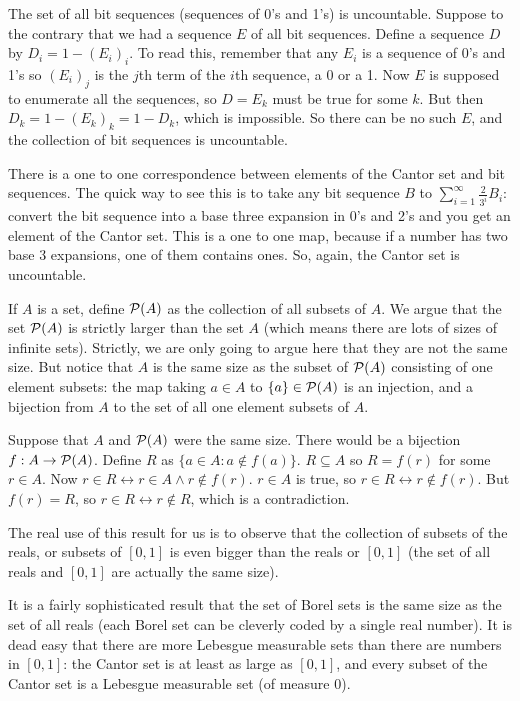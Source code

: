 \documentclass[12pt]{article}
\begin{document}
The set of all bit sequences (sequences of 0's and 1's) is uncountable.  Suppose to the contrary that we had a sequence $E$ of all bit sequences.  Define a sequence $D$ by
$D_i = 1 - (E_i)_i$.  To read this, remember that any $E_i$ is a sequence of 0's and 1's so $(E_i)_j$ is the $j$th term of the $i$th sequence, a 0 or a  1.  Now $E$ is supposed
to enumerate all the sequences, so $D = E_k$ must be true for some $k$.  But then $D_k = 1 - (E_k)_k=1-D_k$, which is impossible.  So there can be no such $E$, and the collection of bit sequences is uncountable.

There is a one to one correspondence between elements of the Cantor set and bit sequences.  The quick way to see this is to take any bit sequence $B$ to $\sum_{i=1}^\infty \frac2{3^i}B_i$:  convert the bit sequence into a base three expansion in 0's and 2's and you get an element of the Cantor set.  This is a one to one map, because if a number has two base 3 expansions, one of them contains ones.  So, again, the Cantor set is uncountable.

If $A$ is a set, define ${\cal P}(A)$ as the collection of all subsets of $A$.  We argue that the set ${\cal P}(A)$ is strictly larger than the set $A$ (which means there are lots of sizes of infinite sets).
Strictly, we are only going to argue here that they are not the same size.  But notice that $A$ is the same size as the subset of  ${\cal P}(A)$ consisting of one element subsets:  the map taking $a \in A$ to
$\{a\} \in {\cal P}(A)$ is an injection, and a bijection from $A$ to the set of all one element subsets of $A$.

Suppose that $A$ and ${\cal P}(A)$ were the same size.  There would be a bijection $f:A \rightarrow {\cal P}(A)$.  Define $R$ as $\{a \in A:a \not\in f(a)\}$.  $R \subseteq A$ so $R=f(r)$ for some $r \in A$.  Now $r \in R \leftrightarrow r\in A \wedge r \not\in f(r)$.  $r \in A$ is true, so $r \in R \leftrightarrow r \not\in f(r)$.  But $f(r) = R$, so $r \in R \leftrightarrow r \not\in R$, which is a contradiction.

The real use of this result for us is to observe that the collection of subsets of the reals, or subsets of $[0,1]$ is even bigger than the reals or $[0,1]$ (the set of all reals and $[0,1]$ are actually the same size).

It is a fairly sophisticated result that the set of Borel sets is the same size as the set of all reals (each Borel set can be cleverly coded by a single real number).  It is dead easy that there are more Lebesgue measurable sets than there are numbers in $[0,1]$:  the Cantor set is at least as large as $[0,1]$, and every subset of the Cantor set is a Lebesgue measurable set (of measure 0).
\end{document}
